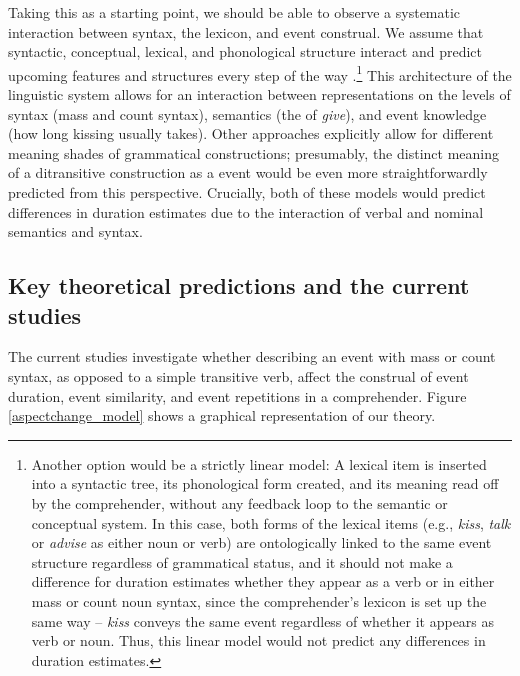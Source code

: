 \documentclass[review,12pt,authoryear]{elsarticle}
\newcommand*{\sectionformat}{\centering}
\begin{document}
Taking this as a starting point, we should be able to observe a systematic interaction between syntax, the lexicon, and event construal. We assume that syntactic, conceptual, lexical, and phonological structure interact and predict upcoming features and structures every step of the way \citep{Jackendoff2007a,Jackendoff2002,GarrodPickering2003,levy2008,martin2016language}.\footnote{Another option would be a strictly linear model: A lexical item is inserted into a syntactic tree, its phonological form created, and its meaning read off by the comprehender, without any feedback loop to the semantic or conceptual system. In this case, both forms of the lexical items (e.g., \emph{kiss}, \emph{talk} or \emph{advise} as either noun or verb) are ontologically linked to the same event structure regardless of grammatical status, and it should not make a difference for duration estimates whether they appear as a verb or in either mass or count noun syntax, since the comprehender's lexicon is set up the same way -- \emph{kiss} conveys the same event regardless of whether it appears as verb or noun. Thus, this linear model would not predict any differences in duration estimates.} This architecture of the linguistic system allows for an interaction between representations on the levels of syntax (mass and count syntax), semantics (the  of \emph{give}), and event knowledge (how long kissing usually takes). Other approaches \citep{goldberg2003,Goldberg1995} explicitly allow for different meaning shades of grammatical constructions; presumably, the distinct meaning of a ditransitive construction as a  event would be even more straightforwardly predicted from this perspective. Crucially, both of these models would predict differences in duration estimates due to the interaction of verbal and nominal semantics and syntax.

\subsection*{\sectionformat Key theoretical predictions and the current studies}\label{sec_predictions}
The current studies investigate whether describing an event with mass or count syntax, as opposed to a simple transitive verb, affect the construal of event duration, event similarity, and event repetitions in a comprehender. Figure \ref{aspectchange_model} shows a graphical representation of our theory.
\end{document}
